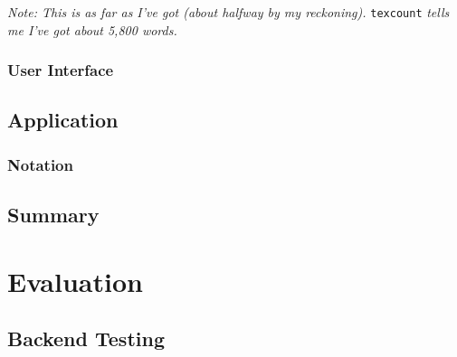 \documentclass[12pt,twoside,notitlepage,xetex]{report}
\begin{document}
\emph{{\sc Note:} This is as far as I've got (about halfway by my reckoning).  }\verb¬texcount¬\emph{ tells me I've got about 5,800 words.}

\subsection{User Interface}

\section{Application}

\subsection{Notation}%

\section{Summary}




\cleardoublepage
\chapter{Evaluation}


\section{Backend Testing}
\end{document}
